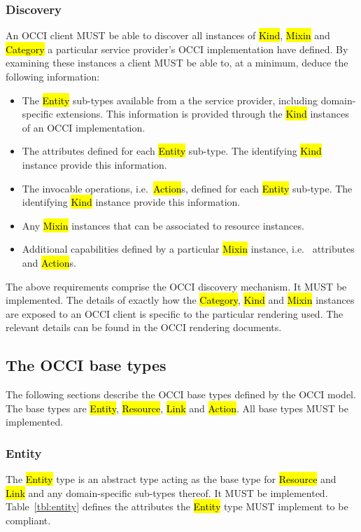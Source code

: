 \documentclass[10pt,a4paper,british]{article}
\begin{document}
\subsubsection{Discovery}
\label{sec:discovery}
An OCCI client MUST be able to discover all instances of \hl{Kind}, \hl{Mixin}
and \hl{Category} a particular service provider's OCCI implementation have
defined. By examining these instances a client MUST be able to, at a minimum,
deduce the following information:
\begin{itemize}
\item The \hl{Entity} sub-types available from a the service provider,
 including domain-specific extensions. This information is provided through the
 \hl{Kind} instances of an OCCI implementation.
\item The attributes defined for each \hl{Entity} sub-type. The identifying
 \hl{Kind} instance provide this information.
\item The invocable operations, i.e.~\hl{Action}s, defined for each \hl{Entity}
 sub-type. The identifying \hl{Kind} instance provide this information.
\item Any \hl{Mixin} instances that can be associated to resource instances.
\item Additional capabilities defined by a particular \hl{Mixin} instance,
 i.e.~ attributes and \hl{Action}s.
\end{itemize}
The above requirements comprise the OCCI discovery mechanism. It MUST be
implemented.
%
The details of exactly how the \hl{Category}, \hl{Kind} and \hl{Mixin}
instances are exposed to an OCCI client is specific to the particular rendering
used.
The relevant details can be found in the OCCI rendering documents.


\subsection{The OCCI base types}
\label{sec:base_types}
The following sections describe the OCCI base types defined by the OCCI model.
The base types are \hl{Entity}, \hl{Resource}, \hl{Link} and \hl{Action}. All
base types MUST be implemented.

\subsubsection{Entity}
\label{sec:entity}
The \hl{Entity} type is an abstract type acting as the base type for
\hl{Resource} and \hl{Link} and any domain-specific sub-types thereof. It MUST
be implemented.
%
Table~\ref{tbl:entity} defines the attributes the \hl{Entity} type MUST implement to
be compliant.
\end{document}
